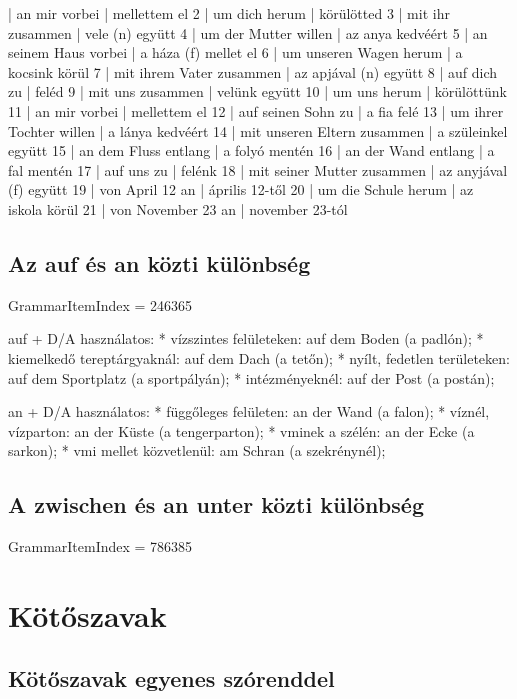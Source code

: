 \documentclass{article}
\newenvironment{desc}{\verbatim}{\endverbatim}
\newenvironment{exmp}{\verbatim}{\endverbatim}
\begin{document}
\begin{exmp}
1 | an mir vorbei | mellettem el
2 | um dich herum | körülötted
3 | mit ihr zusammen | vele (n) együtt
4 | um der Mutter willen | az anya kedvéért
5 | an seinem Haus vorbei | a háza (f) mellet el
6 | um unseren Wagen herum | a kocsink körül
7 | mit ihrem Vater zusammen | az apjával (n) együtt
8 | auf dich zu | feléd
9 | mit uns zusammen | velünk együtt
10 | um uns herum | körülöttünk
11 | an mir vorbei | mellettem el
12 | auf seinen Sohn zu | a fia felé
13 | um ihrer Tochter willen | a lánya kedvéért
14 | mit unseren Eltern zusammen | a szüleinkel együtt
15 | an dem Fluss entlang | a folyó mentén
16 | an der Wand entlang | a fal mentén
17 | auf uns zu | felénk
18 | mit seiner Mutter zusammen | az anyjával (f) együtt
19 | von April 12 an | április 12-től
20 | um die Schule herum | az iskola körül
21 | von November 23 an | november 23-tól
\end{exmp}

\subsection{Az auf és an közti különbség}

GrammarItemIndex = 246365

\begin{desc}
auf + D/A használatos:
* vízszintes felületeken: auf dem Boden (a padlón);
* kiemelkedő tereptárgyaknál: auf dem Dach (a tetőn);
* nyílt, fedetlen területeken: auf dem Sportplatz (a sportpályán);
* intézményeknél: auf der Post (a postán);

an + D/A használatos:
* függőleges felületen: an der Wand (a falon);
* víznél, vízparton: an der Küste (a tengerparton);
* vminek a szélén: an der Ecke (a sarkon);
* vmi mellet közvetlenül: am Schran (a szekrénynél);
\end{desc}

\subsection{A zwischen és an unter közti különbség}

GrammarItemIndex = 786385

\section{Kötőszavak}

\subsection{Kötőszavak egyenes szórenddel}
\end{document}
